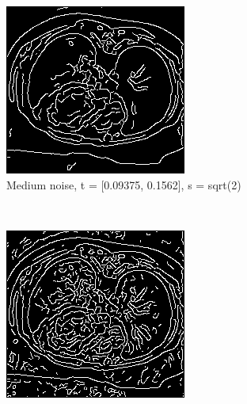 \begin{figure}[H]
  \centering
  
	\begin{subfigure}{.5\textwidth}
    \centering
    \includegraphics[width=.9\textwidth]{./edgedetection/canny_medium_noise/m_noise_insens_l_thres}
    \caption{Medium noise, t = [0.09375, 0.1562], s = sqrt(2)}
    \label{fig:m_noise_insens_l_thres}
  \end{subfigure}\\%
    \begin{subfigure}{.5\textwidth}
    \centering
    \includegraphics[width=.9\textwidth]{./edgedetection/canny_medium_noise/m_noise_sens_h_thres}

\end{subfigure}
\end{figure}
